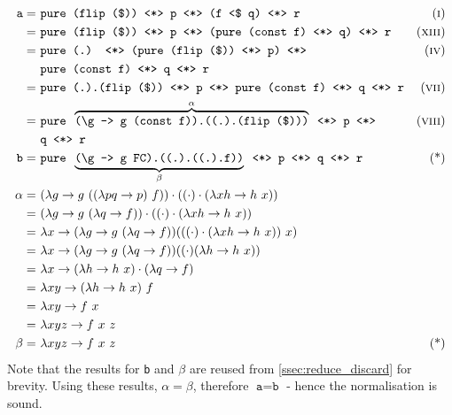 \begin{align*}
    \texttt{a} =\ & \texttt{pure (flip (\$)) \ap p \ap (f \constfmapl q) \ap r} & \equi[1] \\
    =\ & \texttt{pure (flip (\$)) \ap p \ap (pure (const f) \ap q) \ap r} & \equi[13] \\
    =\ & \texttt{pure (.) \ap (pure (flip (\$)) \ap p) \ap} & \equi[4] \\
    & \texttt{pure (const f) \ap q \ap r} \\
    =\ & \texttt{pure (.).(flip (\$)) \ap p \ap pure (const f) \ap q \ap r} & \equi[7] \\
    =\ & \texttt{pure }\overbrace{\texttt{(\textbackslash g -> g (const f)).((.).(flip (\$)))}}^{\alpha}\texttt{ \ap p \ap} & \equi[8] \\
    & \texttt{q \ap r} \\
    \texttt{b} =\ & \texttt{pure }\underbrace{\texttt{(\textbackslash g -> g FC).((.).((.).f))}}_{\beta}\texttt{ \ap p \ap q \ap r} & \text{(*)} \\
    \alpha =\ & (\lambda g \to g\ ((\lambda pq \to p)\ f)) \cdot ((\cdot) \cdot (\lambda xh \to h\ x)) \\
    =\ & (\lambda g \to g\ (\lambda q \to f)) \cdot ((\cdot) \cdot (\lambda xh \to h\ x)) \\
    =\ & \lambda x \to (\lambda g \to g\ (\lambda q \to f)) (((\cdot) \cdot (\lambda xh \to h\ x))\ x) \\
    =\ & \lambda x \to (\lambda g \to g\ (\lambda q \to f)) ((\cdot)(\lambda h \to h\ x)) \\
    =\ & \lambda x \to (\lambda h \to h\ x) \cdot (\lambda q \to f) \\
    =\ & \lambda xy \to (\lambda h \to h\ x)\ f \\
    =\ & \lambda xy \to f\ x \\
    =\ & \lambda xyz \to f\ x\ z \\
    \beta =\ & \lambda xyz \to f\ x\ z & \text{(*)}
\end{align*}
Note that the results for \texttt{b} and $\beta$ are reused from \autoref{ssec:reduce_discard} for brevity.
Using these results, $\alpha = \beta$, therefore $\texttt{a} = \texttt{b}$ - hence the normalisation is sound.

